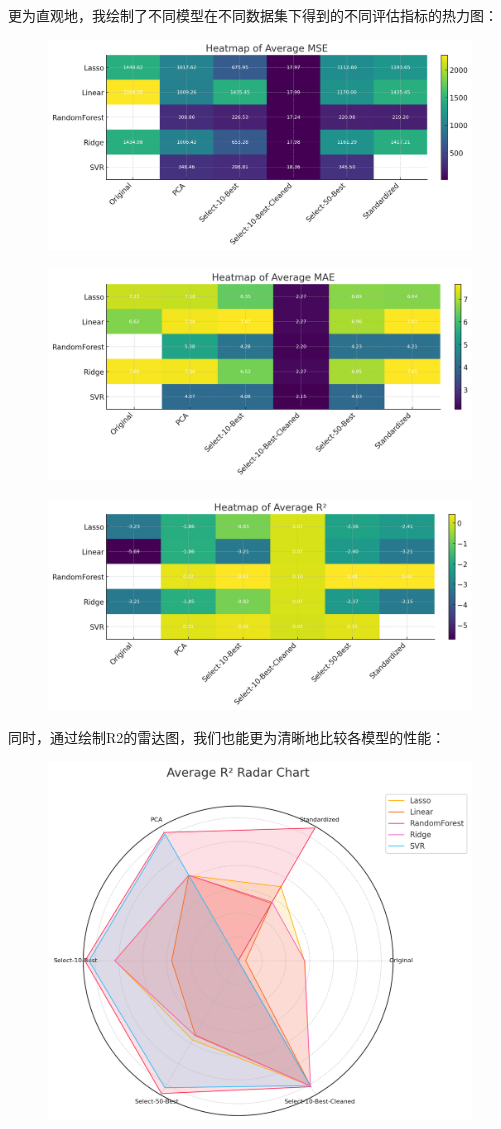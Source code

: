 \documentclass[10pt]{article}
\begin{document}
更为直观地，我绘制了不同模型在不同数据集下得到的不同评估指标的热力图：
\begin{figure}[H]
  \centering
  \includegraphics[width=0.8\linewidth]{heatmap_MSE.png}
  \label{fig:4}
\end{figure}
\begin{figure}[H]
  \centering
  \includegraphics[width=0.8\linewidth]{heatmap_MAE.png}
  \label{fig:5}
\end{figure}
\begin{figure}[H]
  \centering
  \includegraphics[width=0.8\linewidth]{heatmap_R2.png}
  \label{fig:6}
\end{figure}
同时，通过绘制R2的雷达图，我们也能更为清晰地比较各模型的性能：
\begin{figure}[H]
  \centering
  \includegraphics[width=0.7\linewidth]{radar_r2.png}
  \label{fig:7}
\end{figure}
\end{document}
